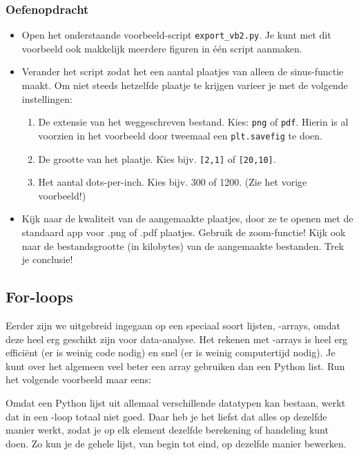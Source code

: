 \documentclass[a4paper,11pt, fleqn]{article}
\begin{document}
\subsubsection*{Oefenopdracht} 
\begin{itemize}
\item Open het onderstaande voorbeeld-script \verb,export_vb2.py,. Je kunt met dit voorbeeld ook makkelijk meerdere figuren in \'e\'en script aanmaken.
\item Verander het script zodat het een aantal plaatjes van alleen de sinus-functie maakt. 
Om niet steeds hetzelfde plaatje te krijgen varieer je met de volgende instellingen:
\begin{enumerate}
\item De extensie van het weggeschreven bestand. Kies: \verb,png, of \verb,pdf,. Hierin is al voorzien in het voorbeeld door tweemaal een \verb,plt.savefig, te doen.
\item De grootte van het plaatje. Kies bijv. \verb=[2,1]= of \verb=[20,10]=.
\item Het aantal dots-per-inch. Kies bijv. 300 of 1200. (Zie het vorige voorbeeld!)
\end{enumerate}

\item Kijk naar de kwaliteit van de aangemaakte plaatjes, door ze te openen met de standaard app voor .png of .pdf plaatjes. Gebruik de zoom-functie! Kijk ook naar de bestandsgrootte (in kilobytes) van de aangemaakte bestanden. Trek je conclusie!


\end{itemize}

\subsection{For-loops}
\label{Ch_forloop}

Eerder zijn we uitgebreid ingegaan op een speciaal soort lijsten, -arrays, omdat deze heel erg geschikt zijn voor data-analyse. 
Het rekenen met -arrays is heel erg efficiënt (er is weinig code nodig) en snel (er is weinig computertijd nodig). Je kunt over het algemeen veel beter een array gebruiken dan een Python list. Run het volgende voorbeeld maar eens:  


Omdat een Python lijst uit allemaal verschillende datatypen kan bestaan, werkt dat in een -loop totaal niet goed. Daar heb je het liefst dat alles op dezelfde manier werkt, zodat je op elk element dezelfde berekening of handeling kunt doen.
Zo kun je de gehele lijst, van begin tot eind, op dezelfde manier bewerken.
\end{document}
